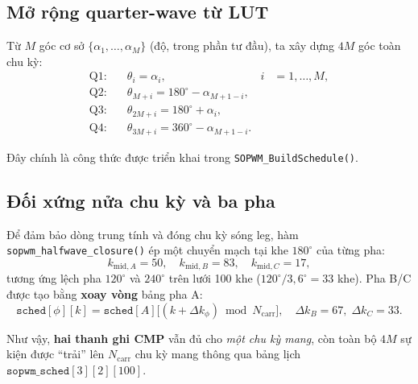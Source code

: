 \documentclass[12pt,a4paper]{article}
\begin{document}
\subsection{Mở rộng quarter-wave từ LUT}

Từ $M$ góc cơ sở $\{\alpha_1,\ldots,\alpha_M\}$ (độ, trong phần tư đầu), ta xây dựng $4M$ góc toàn chu kỳ:
\begin{align}
  \text{Q1:}\quad & \theta_i = \alpha_i, & i &= 1,\ldots,M, \nonumber\\
  \text{Q2:}\quad & \theta_{M+i} = 180^\circ - \alpha_{M+1-i}, & & \nonumber\\
  \text{Q3:}\quad & \theta_{2M+i} = 180^\circ + \alpha_i, & & \nonumber\\
  \text{Q4:}\quad & \theta_{3M+i} = 360^\circ - \alpha_{M+1-i}. &
  \label{eq:quarter_expand}
\end{align}

Đây chính là công thức được triển khai trong \texttt{SOPWM\_BuildSchedule()}.

\subsection{Đối xứng nửa chu kỳ và ba pha}

Để đảm bảo dòng trung tính và đóng chu kỳ sóng leg, hàm \texttt{sopwm\_halfwave\_closure()} ép một chuyển mạch tại khe $180^\circ$ của từng pha:
\begin{equation}
  k_{\mathrm{mid},A} = 50,\quad
  k_{\mathrm{mid},B} = 83,\quad
  k_{\mathrm{mid},C} = 17,
\end{equation}
tương ứng lệch pha $120^\circ$ và $240^\circ$ trên lưới 100 khe ($120^\circ/3{,}6^\circ = 33$ khe). Pha B/C được tạo bằng \textbf{xoay vòng} bảng pha A:
\begin{equation}
  \texttt{sched}[\phi][k] = \texttt{sched}[A]\bigl[(k + \Delta k_\phi) \bmod N_{\mathrm{carr}}\bigr],
  \quad \Delta k_B = 67,\; \Delta k_C = 33.
\end{equation}

Như vậy, \textbf{hai thanh ghi CMP} vẫn đủ cho \emph{một chu kỳ mang}, còn toàn bộ $4M$ sự kiện được ``trải'' lên $N_{\mathrm{carr}}$ chu kỳ mang thông qua bảng lịch $\texttt{sopwm\_sched}[3][2][100]$.
\end{document}
